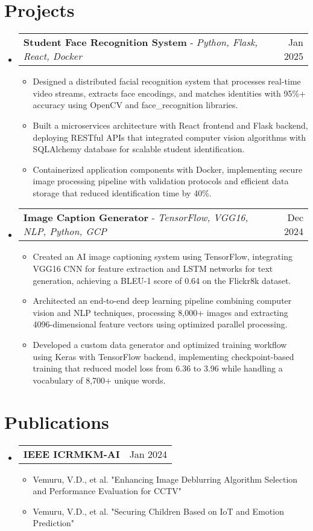 \documentclass[letterpaper,10.5pt]{article}
\makeatletter
\newcommand{\resumeItem}[1]{
  \item\small{
    {#1 \vspace{-3pt}}
  }
}
\newcommand{\resumeProjectHeading}[2]{
    \item
    \begin{tabular*}{0.97\textwidth}{l@{\extracolsep{\fill}}r}
      \small#1 & #2 \\
    \end{tabular*}\vspace{-5pt}
}
\newcommand{\resumePublicationsHeading}[2]{
    \item
    \begin{tabular*}{0.97\textwidth}{l@{\extracolsep{\fill}}r}
      \small#1 & #2 \\
    \end{tabular*}\vspace{-6pt}
}
\newcommand{\resumeSubHeadingListStart}{\begin{itemize}[leftmargin=*]}
\newcommand{\resumeSubHeadingListEnd}{\end{itemize}}
\newcommand{\resumeItemListStart}{\begin{itemize}}
\newcommand{\resumeItemListEnd}{\end{itemize}\vspace{-6pt}}
\makeatother
\begin{document}
\section{Projects}
    \resumeSubHeadingListStart
      \resumeProjectHeading
          {\textbf{Student Face Recognition System} - \emph{Python, Flask, React, Docker}}{Jan 2025}
          \resumeItemListStart
            \resumeItem{Designed a distributed facial recognition system that processes real-time video streams, extracts face encodings, and matches identities with 95\%+ accuracy using OpenCV and face\_recognition libraries.}
            \resumeItem{Built a microservices architecture with React frontend and Flask backend, deploying RESTful APIs that integrated computer vision algorithms with SQLAlchemy database for scalable student identification.}
            \resumeItem{Containerized application components with Docker, implementing secure image processing pipeline with validation protocols and efficient data storage that reduced identification time by 40\%.}
          \resumeItemListEnd
      \resumeProjectHeading
          {\textbf{Image Caption Generator} - \emph{TensorFlow, VGG16, NLP, Python, GCP}}{Dec 2024}
          \resumeItemListStart
            \resumeItem{Created an AI image captioning system using TensorFlow, integrating VGG16 CNN for feature extraction and LSTM networks for text generation, achieving a BLEU-1 score of 0.64 on the Flickr8k dataset.}
            \resumeItem{Architected an end-to-end deep learning pipeline combining computer vision and NLP techniques, processing 8,000+ images and extracting 4096-dimensional feature vectors using optimized parallel processing.}
            \resumeItem{Developed a custom data generator and optimized training workflow using Keras with TensorFlow backend, implementing checkpoint-based training that reduced model loss from 6.36 to 3.96 while handling a vocabulary of 8,700+ unique words.}
          \resumeItemListEnd
    \resumeSubHeadingListEnd

\section{Publications}
    \resumeSubHeadingListStart
      \resumePublicationsHeading
          {\textbf{IEEE ICRMKM-AI}}{Jan 2024}
          \resumeItemListStart
            \resumeItem{Vemuru, V.D., et al. "Enhancing Image Deblurring Algorithm Selection and Performance Evaluation for CCTV"}
            \resumeItem{Vemuru, V.D., et al. "Securing Children Based on IoT and Emotion Prediction"}
          \resumeItemListEnd
    \resumeSubHeadingListEnd
\end{document}
